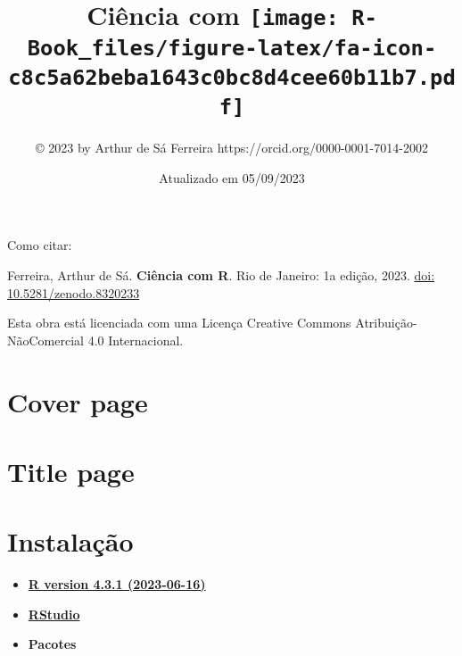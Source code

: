 \documentclass[
]{book}
\title{\textbf{Ciência com \texttt{[image: R-Book\_files/figure-latex/fa-icon-c8c5a62beba1643c0bc8d4cee60b11b7.pdf]}}}
\author{© 2023 by Arthur de Sá Ferreira https://orcid.org/0000-0001-7014-2002}
\date{Atualizado em 05/09/2023}
\providecommand{\tightlist}{%
  \setlength{\itemsep}{0pt}\setlength{\parskip}{0pt}}
\begin{document}
\maketitle

{
\setcounter{tocdepth}{1}
\tableofcontents
}
\hypertarget{section}{%
\chapter*{}\label{section}}

Como citar:

Ferreira, Arthur de Sá. \textbf{Ciência com R}. Rio de Janeiro: 1a edição, 2023. \href{https://zenodo.org/badge/latestdoi/685181979}{doi: 10.5281/zenodo.8320233}

Esta obra está licenciada com uma Licença Creative Commons Atribuição-NãoComercial 4.0 Internacional.

\hypertarget{cover-page}{%
\chapter*{Cover page}\label{cover-page}}

\hypertarget{title-page}{%
\chapter*{Title page}\label{title-page}}

\hypertarget{instalauxe7uxe3o}{%
\chapter*{Instalação}\label{instalauxe7uxe3o}}

\begin{itemize}
\tightlist
\item
  \href{https://cran.rstudio.com/}{\textbf{R version 4.3.1 (2023-06-16)}}
\end{itemize}

\begin{itemize}
\tightlist
\item
  \href{https://posit.co/downloads/}{\textbf{RStudio}}
\end{itemize}

\begin{itemize}
\tightlist
\item
  \textbf{Pacotes}
\end{itemize}
\end{document}
